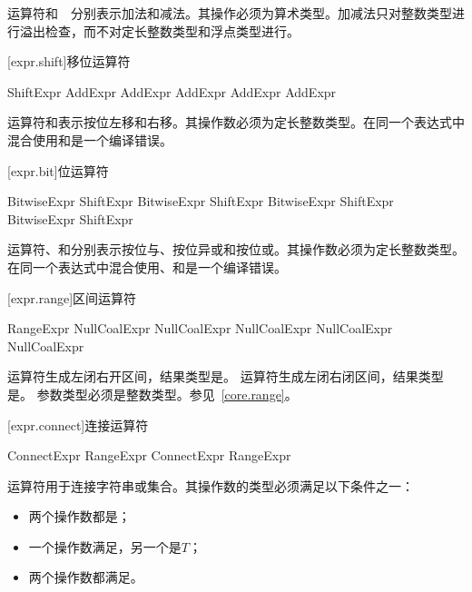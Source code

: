\pnum
运算符\tcode{+}和\ \tcode{-}\ 分别表示加法和减法。其操作必须为算术类型。加减法只对整数类型进行溢出检查，而不对定长整数类型和浮点类型进行。

[expr.shift]{移位运算符}

\begin{bnf}{ShiftExpr}
    AddExpr \br
    AddExpr  AddExpr \br
    AddExpr  AddExpr
\end{bnf}

\pnum
运算符和表示按位左移和右移。其操作数必须为定长整数类型。在同一个表达式中混合使用和是一个编译错误。

[expr.bit]{位运算符}

\begin{bnf}{BitwiseExpr}
    ShiftExpr \br
    BitwiseExpr  ShiftExpr \br
    BitwiseExpr  ShiftExpr \br
    BitwiseExpr  ShiftExpr
\end{bnf}

\pnum
运算符、和分别表示按位与、按位异或和按位或。其操作数必须为定长整数类型。在同一个表达式中混合使用、和是一个编译错误。

[expr.range]{区间运算符}

\begin{bnf}{RangeExpr}
    NullCoalExpr \br
    NullCoalExpr  NullCoalExpr \br
    NullCoalExpr  NullCoalExpr
\end{bnf}

\pnum
运算符生成左闭右开区间，结果类型是。
运算符生成左闭右闭区间，结果类型是。
参数类型必须是整数类型。参见~\ref{core.range}。

[expr.connect]{连接运算符}

\begin{bnf}{ConnectExpr}
    RangeExpr \br
    ConnectExpr \terminal{\~} RangeExpr
\end{bnf}

\pnum
运算符\tcode{\~}用于连接字符串或集合。其操作数的类型必须满足以下条件之一：

\begin{itemize}
    \item 两个操作数都是；
    \item 一个操作数满足，另一个是$T$；
    \item 两个操作数都满足。
\end{itemize}


